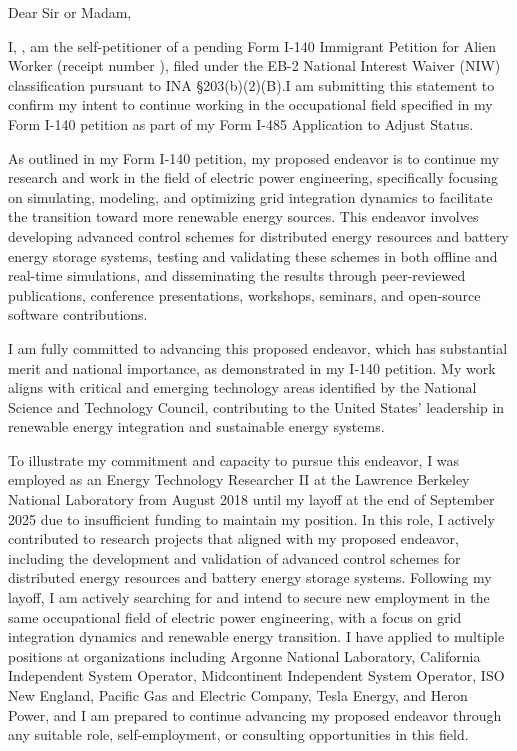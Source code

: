 \setcounter{page}{1}
\pagestyle{fancy}
\fancyhf{}
\rhead{\myFirstName {} \myLastName}

\myAddress

\USCISaddress


Dear Sir or Madam,

I, \myFirstName {} \myLastName, am the self-petitioner of a pending Form I-140 Immigrant Petition for Alien Worker (receipt number \myEBcase), filed under the EB-2 National Interest Waiver (NIW) classification pursuant to INA §203(b)(2)(B).I am submitting this statement to confirm my intent to continue working in the occupational field specified in my Form I-140 petition as part of my Form I-485 Application to Adjust Status.

As outlined in my Form I-140 petition, my proposed endeavor is to continue my research and work in the field of electric power engineering, specifically focusing on simulating, modeling, and optimizing grid integration dynamics to facilitate the transition toward more renewable energy sources. This endeavor involves developing advanced control schemes for distributed energy resources and battery energy storage systems, testing and validating these schemes in both offline and real-time simulations, and disseminating the results through peer-reviewed publications, conference presentations, workshops, seminars, and open-source software contributions.

I am fully committed to advancing this proposed endeavor, which has substantial merit and national importance, as demonstrated in my I-140 petition. My work aligns with critical and emerging technology areas identified by the National Science and Technology Council, contributing to the United States’ leadership in renewable energy integration and sustainable energy systems.

To illustrate my commitment and capacity to pursue this endeavor, I was employed as an Energy Technology Researcher II at the Lawrence Berkeley National Laboratory from August 2018 until my layoff at the end of September 2025 due to insufficient funding to maintain my position. In this role, I actively contributed to research projects that aligned with my proposed endeavor, including the development and validation of advanced control schemes for distributed energy resources and battery energy storage systems. Following my layoff, I am actively searching for and intend to secure new employment in the same occupational field of electric power engineering, with a focus on grid integration dynamics and renewable energy transition. I have applied to multiple positions at organizations including Argonne National Laboratory, California Independent System Operator, Midcontinent Independent System Operator, ISO New England, Pacific Gas and Electric Company, Tesla Energy, and Heron Power, and I am prepared to continue advancing my proposed endeavor through any suitable role, self-employment, or consulting opportunities in this field.

